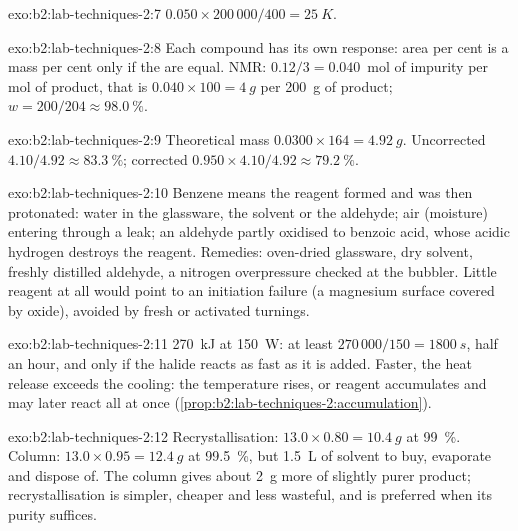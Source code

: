 \begin{solution}{exo:b2:lab-techniques-2:7}
$0.050 \times 200\,000/400 = \qty{25}{K}$.
\end{solution}

\begin{solution}{exo:b2:lab-techniques-2:8}
Each compound has its own response: area per cent is a mass per cent only if the  are
equal. NMR: $0.12/3 = 0.040$~mol of impurity per mol of product, that is $0.040 \times 100 = \qty{4}{g}$
per \qty{200}{g} of product; $w = 200/204 \approx 98.0~\%$.
\end{solution}

\begin{solution}{exo:b2:lab-techniques-2:9}
Theoretical mass $0.0300 \times 164 = \qty{4.92}{g}$. Uncorrected $4.10/4.92 \approx 83.3~\%$; corrected
$0.950 \times 4.10/4.92 \approx 79.2~\%$.
\end{solution}

\begin{solution}{exo:b2:lab-techniques-2:10}
Benzene means the reagent formed and was then protonated: water in the glassware, the solvent or the
aldehyde; air (moisture) entering through a leak; an aldehyde partly oxidised to benzoic acid, whose
acidic hydrogen destroys the reagent. Remedies: oven-dried glassware, dry solvent, freshly distilled
aldehyde, a nitrogen overpressure checked at the bubbler. Little reagent at all would point to an
initiation failure (a magnesium surface covered by oxide), avoided by fresh or activated turnings.
\end{solution}

\begin{solution}{exo:b2:lab-techniques-2:11}
\qty{270}{kJ} at \qty{150}{W}: at least $270\,000/150 = \qty{1800}{s}$, half an hour, and only if the
halide reacts as fast as it is added. Faster, the heat release exceeds the cooling: the temperature rises,
or reagent accumulates and may later react all at once (\cref{prop:b2:lab-techniques-2:accumulation}).
\end{solution}

\begin{solution}{exo:b2:lab-techniques-2:12}
Recrystallisation: $13.0 \times 0.80 = \qty{10.4}{g}$ at 99~\%. Column: $13.0 \times 0.95 =
\qty{12.4}{g}$ at 99.5~\%, but \qty{1.5}{L} of solvent to buy, evaporate and dispose of. The column gives
about \qty{2}{g} more of slightly purer product; recrystallisation is simpler, cheaper and less
wasteful, and is preferred when its purity suffices.
\end{solution}

